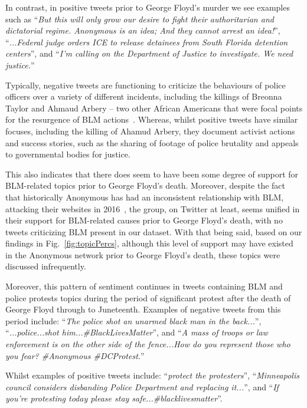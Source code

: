 \documentclass[letterpaper]{article}
\begin{document}
In contrast, in positive tweets prior to George Floyd's murder we see examples such as ``\textit{But this will only grow our desire to fight their authoritarian and dictatorial regime. Anonymous is an idea; And they cannot arrest an idea!}'', ``\textit{...Federal judge orders ICE to release detainees from South Florida detention centers}'', and ``\textit{I'm calling on the Department of Justice to investigate. We need justice.}''

Typically, negative tweets are functioning to criticize the behaviours of police officers over a variety of different incidents, including the killings of Breonna Taylor and Ahmaud Arbery -- two other African Americans that were focal points for the resurgence of BLM actions~\cite{AlJazeera2020}. Whereas, whilst positive tweets have similar focuses, including the killing of Ahamud Arbery, they document activist actions and success stories, such as the sharing of footage of police brutality and appeals to governmental bodies for justice.

This also indicates that there does seem to have been some degree of support for BLM-related topics prior to George Floyd's death. Moreover, despite the fact that historically Anonymous has had an inconsistent relationship with BLM, attacking their websites in 2016~\cite{Verge2016}, the group, on Twitter at least, seems unified in their support for BLM-related causes prior to George Floyd's death, with no tweets criticizing BLM present in our dataset. With that being said, based on our findings in Fig.~\ref{fig:topicPercs}, although this level of support may have existed in the Anonymous network prior to George Floyd's death, these topics were discussed infrequently.

Moreover, this pattern of sentiment continues in tweets containing BLM and police protests topics during the period of significant protest after the death of George Floyd through to Juneteenth. Examples of negative tweets from this period include: ``\textit{The police shot an unarmed black man in the back...}'', ``\textit{...police...shot him...\#BlackLivesMatter}'', and ``\textit{A mass of troops or law enforcement is on the other side of the fence...How do you represent those who you fear? \#Anonymous \#DCProtest.}''

Whilst examples of positive tweets include: ``\textit{protect the protesters}'', ``\textit{Minneapolis council considers disbanding Police Department and replacing it...}'', and ``\textit{If you're protesting today please stay safe...\#blacklivesmatter}''.
\end{document}
